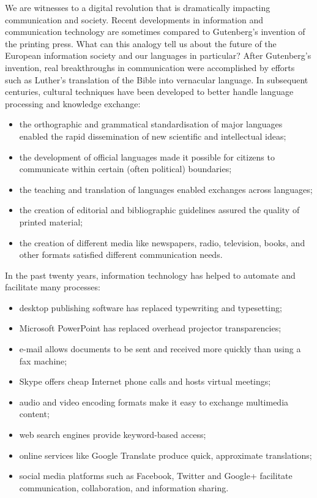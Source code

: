 \begin{multicols}{2}

We are witnesses to a digital revolution that is dramatically impacting communication and society. Recent developments in information and communication technology are sometimes compared to Gutenberg’s invention of the printing press. What can this analogy tell us about the future of the European information society and our languages in particular? 
After Gutenberg’s invention, real breakthroughs in communication were accomplished by efforts such as Luther’s translation of the Bible into vernacular language. In subsequent centuries, cultural techniques have been developed to better handle language processing and knowledge exchange:

\begin{itemize}
\item the orthographic and grammatical standardisation of major languages enabled the rapid dissemination of new scientific and intellectual ideas;
\item the development of official languages made it possible for citizens to communicate within certain (often political) boundaries;
\item the teaching and translation of languages enabled exchanges across languages;
\item the creation of editorial and bibliographic guidelines assured the quality of printed material;
\item the creation of different media like newspapers, radio, television, books, and other formats satisfied different communication needs. 
\end{itemize}

In the past twenty years, information technology has helped to automate and facilitate many processes:

\begin{itemize}
\item desktop publishing software has replaced typewriting and typesetting;
\item Microsoft PowerPoint has replaced overhead projector transparencies;
\item e-mail allows documents to be sent and received more quickly than using a fax machine;
\item Skype offers cheap Internet phone calls and hosts virtual meetings;
\item audio and video encoding formats make it easy to exchange multimedia content;
\item web search engines provide keyword-based access;
\item online services like Google Translate produce quick, approximate translations;
\item social media platforms such as Facebook, Twitter and Google+ facilitate communication, collaboration, and information sharing.
\end{itemize}


\end{multicols}
